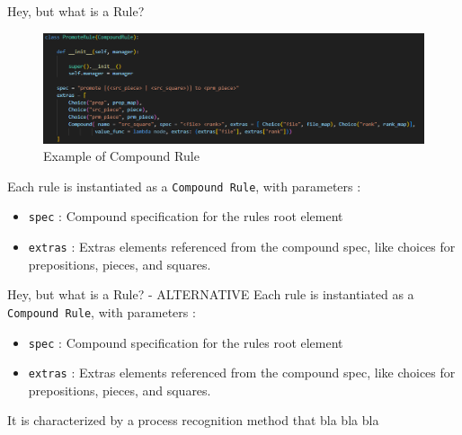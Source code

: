 \documentclass[english]{beamer}
\begin{document}
\begin{frame}{Hey, but what is a Rule?}
    \begin{figure}
        \centering
        \includegraphics[width=\textwidth]{images/compound_rule.png}
        \caption{Example of Compound Rule}
    \end{figure}
    Each rule is instantiated as a \texttt{Compound Rule}, with parameters : 
    \begin{itemize}
        \item \texttt{spec} : Compound specification for the rules root element 
        \item \texttt{extras} :  Extras elements referenced from the compound spec, like choices for prepositions, pieces, and squares.
    \end{itemize}
\end{frame}

\begin{frame}{Hey, but what is a Rule? - ALTERNATIVE}
    Each rule is instantiated as a \texttt{Compound Rule}, with parameters : 
    \begin{itemize}
        \item \texttt{spec} : Compound specification for the rules root element 
        \item \texttt{extras} :  Extras elements referenced from the compound spec, like choices for prepositions, pieces, and squares.
    \end{itemize}
    It is characterized by a process recognition method that bla bla bla 
\end{frame}
\end{document}
